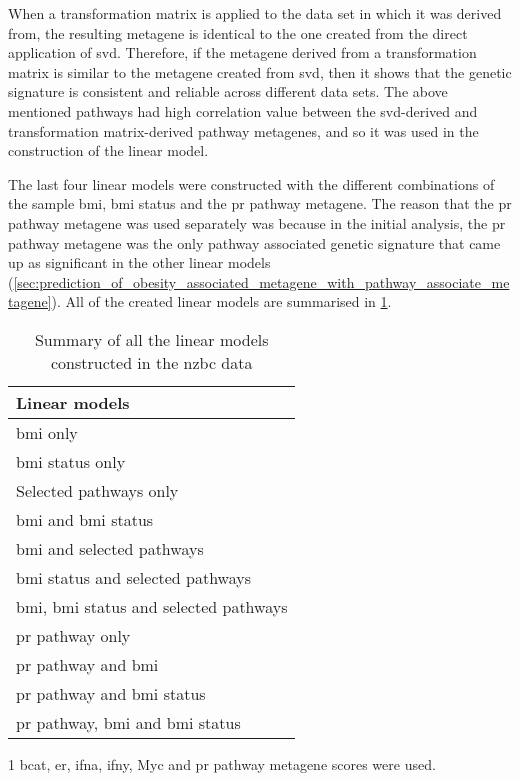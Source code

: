 When a transformation matrix is applied to the data set in which it was derived from, the resulting metagene is identical to the one created from the direct application of \gls{svd}.
Therefore, if the metagene derived from a transformation matrix is similar to the metagene created from \gls{svd}, then it shows that the genetic signature is consistent and reliable across different data sets.
The above mentioned pathways had high correlation value between the \gls{svd}-derived and transformation matrix-derived pathway metagenes, and so it was used in the construction of the linear model.

The last four linear models were constructed with the different combinations of the sample \gls{bmi}, \gls{bmi} status and the \gls{pr} pathway metagene.
The reason that the \gls{pr} pathway metagene was used separately was because in the initial analysis, the \gls{pr} pathway metagene was the only pathway associated genetic signature that came up as significant in the other linear models (\cref{sec:prediction_of_obesity_associated_metagene_with_pathway_associate_metagene}).
All of the created linear models are summarised in \cref{tab:lm_model_method}.

\begin{table}[htpb]
	\centering
	\begin{threeparttable}
		\caption{Summary of all the linear models constructed in the \gls{nzbc} data}
		\label{tab:lm_model_method}
		\begin{tabular}{l}
			Linear models\\
			\hline
			\hline
			\gls{bmi} only\\
			\gls{bmi} status only\\
			Selected pathways only\tnote{1}\\
			\gls{bmi} and \gls{bmi} status\\
			\gls{bmi} and selected pathways\tnote{1}\\
			\gls{bmi} status and selected pathways\tnote{1}\\
			\gls{bmi}, \gls{bmi} status and selected pathways\tnote{1}\\
			\gls{pr} pathway only\\
			\gls{pr} pathway and \gls{bmi}\\
			\gls{pr} pathway and \gls{bmi} status\\
			\gls{pr} pathway, \gls{bmi} and \gls{bmi} status\\
			\hline
			\hline
		\end{tabular}
		\begin{tablenotes}
			\begin{footnotesize}
			\item [1] \gls{bcat}, \gls{er}, \gls{ifna}, \Gls{ifny}, Myc and \gls{pr} pathway metagene scores were used.
			\end{footnotesize}
		\end{tablenotes}
	\end{threeparttable}
\end{table}

